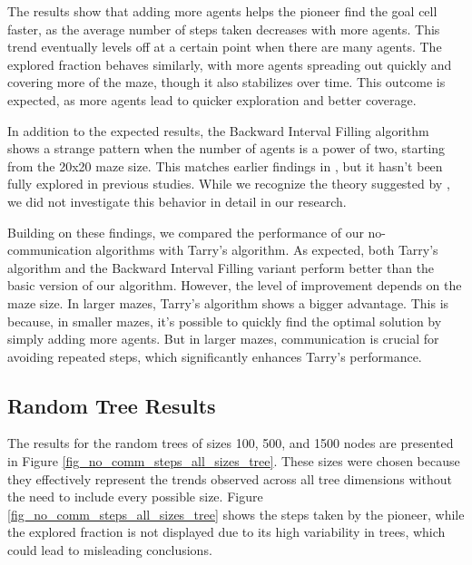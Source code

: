 The results show that adding more agents helps the pioneer find the goal cell faster, as the average number of steps taken decreases with more agents. This trend eventually levels off at a certain point when there are many agents. The explored fraction behaves similarly, with more agents spreading out quickly and covering more of the maze, though it also stabilizes over time. This outcome is expected, as more agents lead to quicker exploration and better coverage.

In addition to the expected results, the Backward Interval Filling algorithm shows a strange pattern when the number of agents is a power of two, starting from the 20x20 maze size. This matches earlier findings in \cite{Arthur2023}, but it hasn't been fully explored in previous studies. While we recognize the theory suggested by , we did not investigate this behavior in detail in our research.

Building on these findings, we compared the performance of our no-communication algorithms with Tarry's algorithm. As expected, both Tarry's algorithm and the Backward Interval Filling variant perform better than the basic version of our algorithm. However, the level of improvement depends on the maze size. In larger mazes, Tarry's algorithm shows a bigger advantage. This is because, in smaller mazes, it's possible to quickly find the optimal solution by simply adding more agents. But in larger mazes, communication is crucial for avoiding repeated steps, which significantly enhances Tarry's performance.

\subsection{Random Tree Results} 
\label{subsection_no_comm_random_tree_results}

The results for the random trees of sizes 100, 500, and 1500 nodes are presented in Figure \ref{fig_no_comm_steps_all_sizes_tree}. These sizes were chosen because they effectively represent the trends observed across all tree dimensions without the need to include every possible size. Figure \ref{fig_no_comm_steps_all_sizes_tree} shows the steps taken by the pioneer, while the explored fraction is not displayed due to its high variability in trees, which could lead to misleading conclusions.

